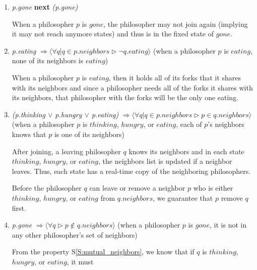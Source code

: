 \documentclass[11pt]{article}
\begin{document}
\begin{enumerate}[S1]
\item {\it p.gone} {\bfseries next} {\it (p.gone)}

When a philosopher $p$ is $gone$, the philosopher may not join again (implying it may not reach anymore states) and thus is in the fixed state of $gone$.

\item {\it p.eating} $\Rightarrow \langle \forall q | q \in p.neighbors \rhd \neg q.eating \rangle$
(when a philosopher $p$ is $eating$, none of its neighbors is $eating$)

When a philosopher $p$ is $eating$, then it holds all of its forks that it shares with its neighbors and since a philosopher needs all of the forks it shares with its neighbors, that philosopher with the forks will be the only one eating.


\item \label{S:mutual_neighbors} {\it (p.thinking $\vee$ p.hungry $\vee$ p.eating)} $\Rightarrow \langle \forall q | q \in p.neighbors \rhd p \in q.neighbors \rangle$
(when a philosopher $p$ is $thinking$, $hungry$, or $eating$, each of $p$'s neighbors knows that $p$ is one of its neighbors)

After joining, a leaving philosopher $q$ knows its neighbors and in each state $thinking$, $hungry$, or $eating$, the neighbors list is updated if a neighbor leaves. Thus, each state has a real-time copy of the neighboring philosophers.

Before the philosopher $q$ can leave or remove a neighbor $p$ who is either $thinking$, $hungry$, or $eating$ from $q.neighbors$, we guarantee that $p$ remove $q$ first.

\item {\it p.gone} $\Rightarrow \langle \forall q  \rhd p\not\in q.neighbors \rangle$
(when a philosopher $p$ is $gone$, it is not in any other philosopher's set of neighbors)

From the property S\ref{S:mutual_neighbors}, we know that if $q$ is $thinking$, $hungry$, or $eating$, it must

\end{enumerate}
\end{document}
